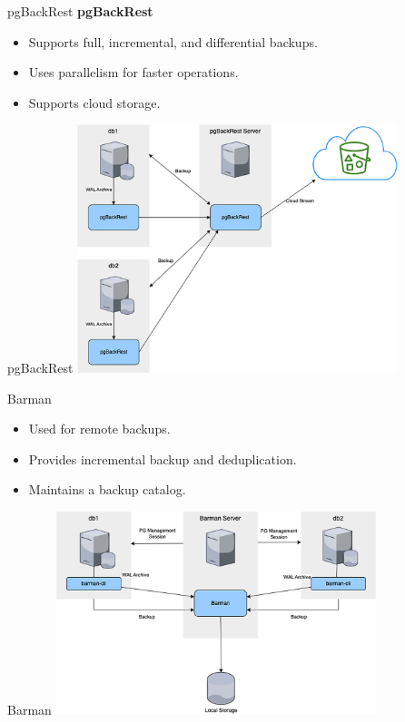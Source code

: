 \documentclass[aspectratio=169]{beamer}
\begin{document}
\begin{frame}{pgBackRest}
    \textbf{pgBackRest}
    \begin{itemize}
        \item Supports full, incremental, and differential backups.
        \item Uses parallelism for faster operations.
        \item Supports cloud storage.
    \end{itemize}
\end{frame}

\begin{frame}{pgBackRest}
    \centering
    \includegraphics[width=0.7\textwidth]{figures/pgbackrest}
\end{frame}

\begin{frame}{Barman}
    \begin{itemize}
        \item Used for remote backups.
        \item Provides incremental backup and deduplication.
        \item Maintains a backup catalog.
    \end{itemize}
\end{frame}

\begin{frame}{Barman}
    \centering
    \includegraphics[width=0.7\textwidth]{figures/barman}
\end{frame}
\end{document}
